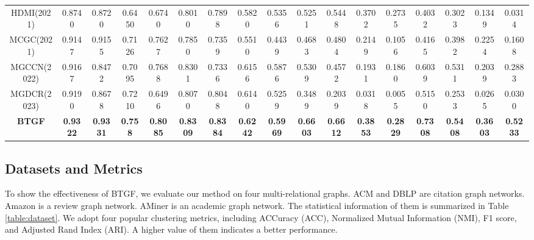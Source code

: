 \documentclass[letterpaper]{article} %
\begin{document}
\begin{table}[!htb]
{\begin{tabular}{c|cccc|cccc|cccc|cccc}
HDMI(2021)         & 0.8740                                 & 0.8720                        & 0.6450         & 0.6740                        & 0.8010                                 & {0.7898}          & 0.5820          & {0.5356}          & {0.5251}          & {0.5448} & {0.3702} & {0.2735} & 0.4032                        & {0.3023} & {0.1349} & {0.0314} \\
MCGC(2021)         & 0.9147                                 & 0.9155                        & 0.7126         & 0.7627                        & 0.7850                                 & {0.7359}          & 0.5510          & {0.4439}          & {0.4683}          & {0.4804} & {0.2149} & {0.1056} & {0.4165} & {0.3982} & {0.2254} & {0.1608} \\
MGCCN(2022)        & 0.9167                                 & 0.8472                        & 0.7095         & 0.7688                        & 0.8301                                 & 0.7336                                 & 0.6156          & 0.5876                                 & 0.5309                                 & 0.4572                        & 0.1931                        & 0.1860                        & 0.6039                        & 0.5311                        & 0.2039                        & 0.2883                        \\
MGDCR(2023)        & 0.9190                                 & {0.8678} & 0.7210         & {0.6496} & 0.8070                                 & {0.8048}          & 0.6140          & {0.5259}          & {0.3489}          & {0.2039} & {0.0318} & {0.0055} & {0.5150} & {0.2533} & {0.0265} & {0.0300} \\ \midrule[1pt]%
\textbf{BTGF} & {\textbf{0.9322}} & \textbf{0.9331}               & \textbf{0.758} & \textbf{0.8085}               & {\textbf{0.8309}} & {\textbf{0.8384}} & \textbf{0.6242} & {\textbf{0.5969}} & {\textbf{0.6603}} & \textbf{0.6612}               & \textbf{0.3853}               & \textbf{0.2829}               & \textbf{0.7308}               & \textbf{0.5408}               & \textbf{0.3603}               & \textbf{0.5233}                \\ \bottomrule[2pt]%
\end{tabular}}
\end{table}


\subsection{Datasets and Metrics}
To show the effectiveness of BTGF, we evaluate our method on four multi-relational graphs. ACM and DBLP \cite{fan2020one2multi} are citation graph networks. Amazon \cite{he2016ups} is a review graph network. AMiner \cite{wang2021self} is an academic graph network. The statistical information of them is summarized in Table \ref{table:dataset}.
We adopt four popular clustering metrics, including ACCuracy (ACC), Normalized Mutual Information (NMI), F1 score, and Adjusted Rand Index (ARI). A higher value of them indicates a better performance.
\end{document}
